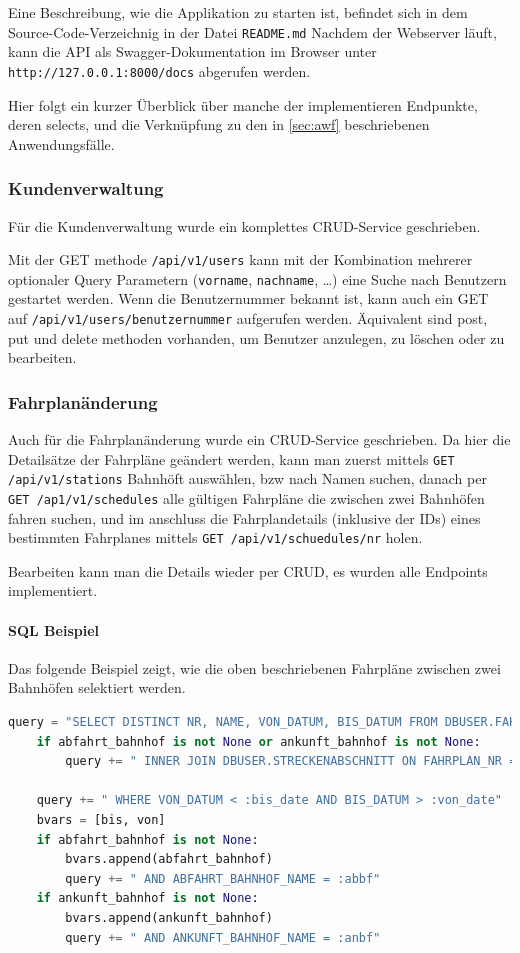 Eine Beschreibung, wie die Applikation zu starten ist, befindet sich in dem Source-Code-Verzeichnig in der Datei \texttt{README.md}
Nachdem der Webserver läuft, kann die API als Swagger-Dokumentation im Browser unter \texttt{http://127.0.0.1:8000/docs} abgerufen werden.

Hier folgt ein kurzer Überblick über manche der implementieren Endpunkte, deren selects, 
und die Verknüpfung zu den in \ref{sec:awf} beschriebenen Anwendungsfälle.

\subsubsection{Kundenverwaltung}

Für die Kundenverwaltung wurde ein komplettes CRUD-Service geschrieben.

Mit der GET methode \texttt{/api/v1/users} kann mit der Kombination mehrerer optionaler Query Parametern 
(\texttt{vorname}, \texttt{nachname}, \dots) eine Suche nach Benutzern gestartet werden.
Wenn die Benutzernummer bekannt ist, kann auch ein GET auf \texttt{/api/v1/users/{benutzernummer}} aufgerufen werden.
Äquivalent sind post, put und delete methoden vorhanden, um Benutzer anzulegen, zu löschen oder zu bearbeiten.


\subsubsection{Fahrplanänderung}

Auch für die Fahrplanänderung wurde ein CRUD-Service geschrieben. Da hier die Detailsätze der Fahrpläne geändert werden, 
kann man zuerst mittels \texttt{GET /api/v1/stations} Bahnhöft auswählen, bzw nach Namen suchen, 
danach per \texttt{GET /ap1/v1/schedules} alle gültigen Fahrpläne die zwischen zwei Bahnhöfen fahren suchen,
und im anschluss die Fahrplandetails (inklusive der IDs) eines bestimmten Fahrplanes mittels \texttt{GET /api/v1/schuedules/{nr}} holen.

Bearbeiten kann man die Details wieder per CRUD, es wurden alle Endpoints implementiert.

\paragraph{SQL Beispiel}
Das folgende Beispiel zeigt, wie die oben beschriebenen Fahrpläne zwischen zwei Bahnhöfen selektiert werden.

\begin{lstlisting}[language=Python]
    query = "SELECT DISTINCT NR, NAME, VON_DATUM, BIS_DATUM FROM DBUSER.FAHRPLAN"
    if abfahrt_bahnhof is not None or ankunft_bahnhof is not None:
        query += " INNER JOIN DBUSER.STRECKENABSCHNITT ON FAHRPLAN_NR = NR"

    query += " WHERE VON_DATUM < :bis_date AND BIS_DATUM > :von_date"
    bvars = [bis, von]
    if abfahrt_bahnhof is not None:
        bvars.append(abfahrt_bahnhof)
        query += " AND ABFAHRT_BAHNHOF_NAME = :abbf"
    if ankunft_bahnhof is not None:
        bvars.append(ankunft_bahnhof)
        query += " AND ANKUNFT_BAHNHOF_NAME = :anbf"
\end{lstlisting}

